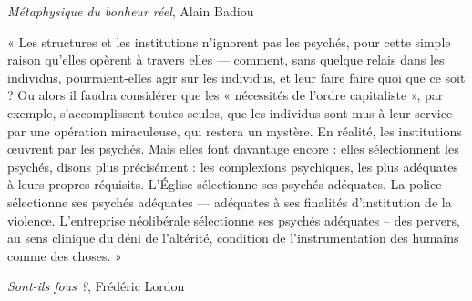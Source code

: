 \documentclass{article}
\begin{document}
\begin{flushright}\textit{Métaphysique du bonheur réel}, Alain Badiou\end{flushright}
\vspace{7pt}
\begin{center} « Les structures et les institutions n’ignorent pas les psychés, pour cette simple raison qu’elles opèrent à travers elles — comment, sans quelque relais dans les individus, pourraient-elles agir sur les individus, et leur faire faire quoi que ce soit ? Ou alors il faudra considérer que les « nécessités de l’ordre capitaliste », par exemple, s’accomplissent toutes seules, que les individus sont mus à leur service par une opération miraculeuse, qui restera un mystère. En réalité, les institutions œuvrent par les psychés. Mais elles font davantage encore : elles sélectionnent les psychés, disons plus précisément : les complexions psychiques, les plus adéquates à leurs propres réquisits. L’Église sélectionne ses psychés adéquates. La police sélectionne ses psychés adéquates — adéquates à ses finalités d’institution de la violence. L’entreprise néolibérale sélectionne ses psychés adéquates – des pervers, au sens clinique du déni de l’altérité, condition de l’instrumentation des humains comme des choses. » \end{center} 

\begin{flushright}\textit{Sont-ils fous ?}, Frédéric Lordon\end{flushright}
\vspace{8pt}
\end{document}
